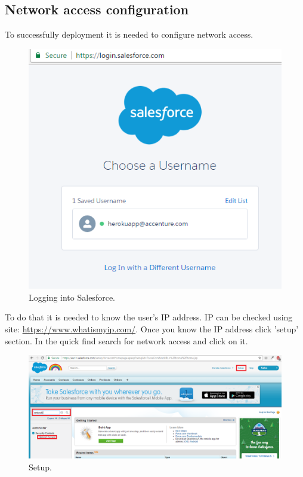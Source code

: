 \documentclass[12pt,a4paper]{article}
\begin{document}
\subsection{Network access configuration}
To successfully deployment it is needed to configure network access.
\begin{figure}[H]
	\centering
	\includegraphics{images/connect5.PNG}
	\caption{Logging into Salesforce.}
	\label{fig:log}
\end{figure}
To do that it is needed to know the user’s IP address. IP can be checked using site: \url{https://www.whatismyip.com/}.
Once you know the IP address click 'setup' section. In the quick find search for network access and click on it.  

\begin{figure}[H]
	\centering
	\includegraphics[width = 1 \textwidth]{images/network.PNG}
	\caption{Setup.}
	\label{fig:setup}
\end{figure}
\end{document}
